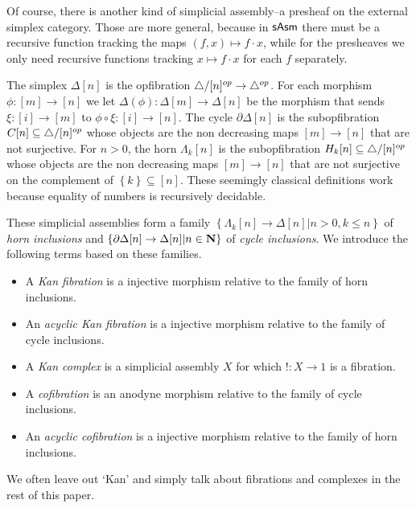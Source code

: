 \documentclass{amsart}
\theoremstyle{plain}
\theoremstyle{definition}
\newcommand\cat\mathcal
\newcommand\set[1]{\left\{#1\right\}}
\newcommand\Asm{\mathsf{Asm}}
\begin{document}

Of course, there is another kind of simplicial assembly--a presheaf on the external simplex category. Those are more general, because in $\mathsf{sAsm}$ there must be a recursive function tracking the maps $(f,x)\mapsto f\cdot x$, while for the presheaves we only need recursive functions tracking $x\mapsto f\cdot x$ for each $f$ separately.

The simplex $\Delta[n]$ is the opfibration ${\mathord{\triangle}}/[n]^{op}\to{\mathord{\triangle}}^{op}$. For each morphism $\phi:[m]\to[n]$ we let $\Delta(\phi):\Delta[m] \to \Delta[n]$ be the morphism that sends $\xi:[i]\to [m]$ to $\phi\circ \xi:[i]\to [n]$. The cycle $\partial\Delta[n]$ is the subopfibration $C[n]\subseteq {\mathord{\triangle}}/[n]^{op}$ whose objects are the non decreasing maps $[m]\to[n]$ that are not surjective. For $n>0$, the horn $\Lambda_k[n]$ is the subopfibration $H_k[n]\subseteq{\mathord{\triangle}}/[n]^{op}$ whose objects are the non decreasing maps $[m]\to[n]$ that are not surjective on the complement of $\set k\subseteq[n]$. These seemingly classical definitions work because equality of numbers is recursively decidable.

These simplicial assemblies form a family $\set{\Lambda_k[n]\to\Delta[n]|n>0,k\leq n}$ of \emph{horn inclusions} and $\set{\partial\Delta[n]\to\Delta[n]|n\in \nno}$ of \emph{cycle inclusions}. We introduce the following terms based on these families.
\begin{itemize}
\item A \emph{Kan fibration} is a injective morphism relative to the family of horn inclusions.
\item An \emph{acyclic Kan fibration} is a injective morphism relative to the family of cycle inclusions.
\item A \emph{Kan complex} is a simplicial assembly $X$ for which $!:X\to 1$ is a fibration.
\item A \emph{cofibration} is an anodyne morphism relative to the family of cycle inclusions.
\item An \emph{acyclic cofibration} is a injective morphism relative to the family of horn inclusions. 
\end{itemize}
We often leave out `Kan' and simply talk about fibrations and complexes in the rest of this paper. %
\end{document}
